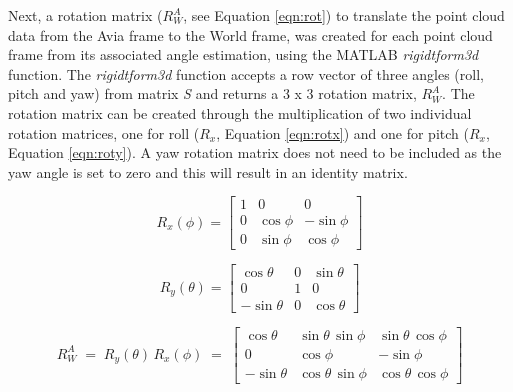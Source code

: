 Next, a rotation matrix (\textit{$R_W^A$}, see Equation \ref{eqn:rot}) to translate the point cloud data from the Avia frame to the World frame, was created for each point cloud frame from its associated angle estimation, using the MATLAB \textit{rigidtform3d} function. The \textit{rigidtform3d} function accepts a row vector of three angles (roll, pitch and yaw) from matrix \textit{S} and returns a 3 x 3 rotation matrix, \textit{$R_W^A$}. The rotation matrix can be created through the multiplication of two individual rotation matrices, one for roll (\textit{$R_x$}, Equation \ref{eqn:rotx}) and one for pitch (\textit{$R_x$}, Equation \ref{eqn:roty}). A yaw rotation matrix does not need to be included as the yaw angle is set to zero and this will result in an identity matrix. 

\begin{equation} \label{eqn:rotx}
     R_x(\phi) =
    \begin{bmatrix}
    1 & 0 & 0 \\
    0 & \cos\phi & -\sin\phi \\
    0 & \sin\phi & \cos\phi
    \end{bmatrix}
\end{equation}

\begin{equation} \label{eqn:roty}
    R_y(\theta) =
    \begin{bmatrix}
    \cos\theta & 0 & \sin\theta \\
    0 & 1 & 0 \\
    -\sin\theta & 0 & \cos\theta
    \end{bmatrix}
\end{equation}

\begin{equation} \label{eqn:rot}
    R_W^A \;=\; R_y(\theta)\,R_x(\phi)
    \;=\;
    \begin{bmatrix}
    \cos\theta & \sin\theta\,\sin\phi & \sin\theta\,\cos\phi \\
    0 & \cos\phi & -\sin\phi \\
    -\sin\theta & \cos\theta\,\sin\phi & \cos\theta\,\cos\phi
    \end{bmatrix}
\end{equation}

